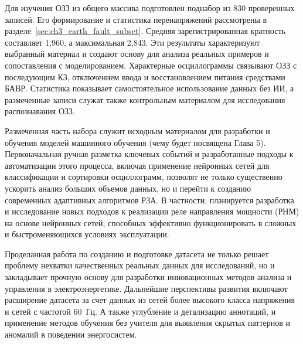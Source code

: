 Для изучения ОЗЗ из общего массива подготовлен поднабор из 830
проверенных записей. Его формирование и статистика перенапряжений
рассмотрены в разделе~\ref{sec:ch3_earth_fault_subset}. Средняя
зарегистрированная кратность составляет 1,960, а максимальная 2,843.
Эти результаты характеризуют выбранный материал и создают основу
для анализа реальных примеров и сопоставления с моделированием.
Характерные осциллограммы связывают ОЗЗ с последующим КЗ,
отключением ввода и восстановлением питания средствами БАВР.
Статистика показывает самостоятельное использование данных без ИИ,
а размеченные записи служат также контрольным материалом
для исследования распознавания ОЗЗ.

Размеченная часть набора служит исходным материалом для разработки и обучения моделей
машинного обучения (чему будет посвящена Глава 5). Первоначальная ручная разметка
ключевых событий и разработанные подходы к автоматизации этого процесса, включая
применение нейронных сетей для классификации и сортировки осциллограмм, позволят не
только существенно ускорить анализ больших объемов данных, но и перейти к созданию
современных адаптивных алгоритмов РЗА. В частности, планируется разработка и
исследование новых подходов к реализации реле направления мощности (РНМ) на основе
нейронных сетей, способных эффективно функционировать в сложных и быстроменяющихся
условиях эксплуатации.

Проделанная работа по созданию и подготовке датасета не только решает проблему нехватки
качественных реальных данных для исследований, но и закладывает прочную основу для
разработки инновационных методов анализа и управления в электроэнергетике. Дальнейшие
перспективы развития включают расширение датасета за счет данных из сетей более высокого
класса напряжения и сетей с частотой 60~Гц. А также углубление и детализацию аннотаций,
и применение методов обучения без учителя для выявления скрытых паттернов и аномалий в
поведении энергосистем.

